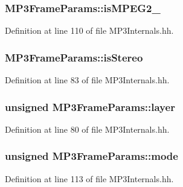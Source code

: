 \subsubsection[{is\+M\+P\+E\+G2\+\_\+5}]{ M\+P3\+Frame\+Params\+::is\+M\+P\+E\+G2\+\_\hspace{0.3cm}{\ttfamily [private]}}\label{classMP3FrameParams_aa369c29dc18b3c27e0d449d0bad4ebea}


Definition at line 110 of file M\+P3\+Internals.\+hh.

\subsubsection[{is\+Stereo}]{ M\+P3\+Frame\+Params\+::is\+Stereo}\label{classMP3FrameParams_a36700fd8732ccccb76869300ba5ccd32}


Definition at line 83 of file M\+P3\+Internals.\+hh.

\subsubsection[{layer}]{\setlength{\rightskip}{0pt plus 5cm}unsigned M\+P3\+Frame\+Params\+::layer}\label{classMP3FrameParams_afd2eac47e61cd82e6be9a37329d72830}


Definition at line 80 of file M\+P3\+Internals.\+hh.

\subsubsection[{mode}]{\setlength{\rightskip}{0pt plus 5cm}unsigned M\+P3\+Frame\+Params\+::mode\hspace{0.3cm}{\ttfamily [private]}}\label{classMP3FrameParams_a6ed08ea7bcad2d0172b83a7553fb708a}


Definition at line 113 of file M\+P3\+Internals.\+hh.

